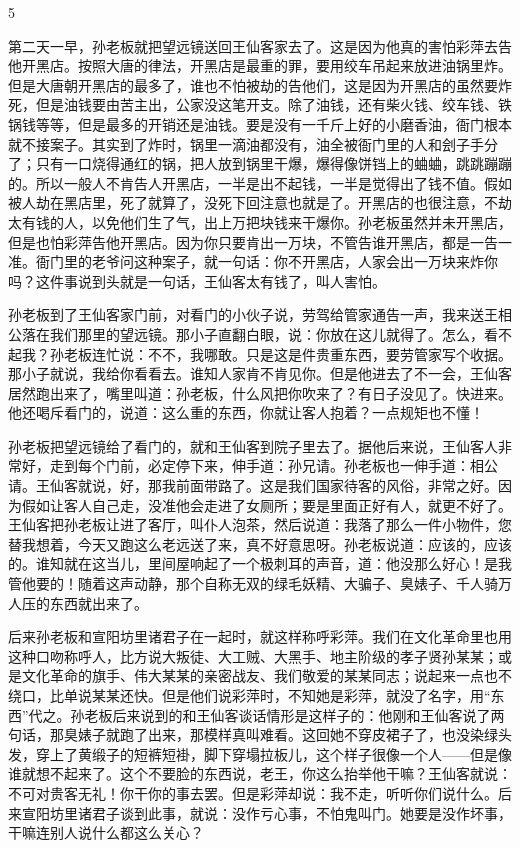5 

第二天一早，孙老板就把望远镜送回王仙客家去了。这是因为他真的害怕彩萍去告他开黑店。按照大唐的律法，开黑店是最重的罪，要用绞车吊起来放进油锅里炸。但是大唐朝开黑店的最多了，谁也不怕被劫的告他们，这是因为开黑店的虽然要炸死，但是油钱要由苦主出，公家没这笔开支。除了油钱，还有柴火钱、绞车钱、铁锅钱等等，但是最多的开销还是油钱。要是没有一千斤上好的小磨香油，衙门根本就不接案子。其实到了炸时，锅里一滴油都没有，油全被衙门里的人和刽子手分了；只有一口烧得通红的锅，把人放到锅里干爆，爆得像饼铛上的蛐蛐，跳跳蹦蹦的。所以一般人不肯告人开黑店，一半是出不起钱，一半是觉得出了钱不值。假如被人劫在黑店里，死了就算了，没死下回注意也就是了。开黑店的也很注意，不劫太有钱的人，以免他们生了气，出上万把块钱来干爆你。孙老板虽然并未开黑店，但是也怕彩萍告他开黑店。因为你只要肯出一万块，不管告谁开黑店，都是一告一准。衙门里的老爷问这种案子，就一句话：你不开黑店，人家会出一万块来炸你吗？这件事说到头就是一句话，王仙客太有钱了，叫人害怕。 

孙老板到了王仙客家门前，对看门的小伙子说，劳驾给管家通告一声，我来送王相公落在我们那里的望远镜。那小子直翻白眼，说：你放在这儿就得了。怎么，看不起我？孙老板连忙说：不不，我哪敢。只是这是件贵重东西，要劳管家写个收据。那小子就说，我给你看看去。谁知人家肯不肯见你。但是他进去了不一会，王仙客居然跑出来了，嘴里叫道：孙老板，什么风把你吹来了？有日子没见了。快进来。他还喝斥看门的，说道：这么重的东西，你就让客人抱着？一点规矩也不懂！ 

孙老板把望远镜给了看门的，就和王仙客到院子里去了。据他后来说，王仙客人非常好，走到每个门前，必定停下来，伸手道：孙兄请。孙老板也一伸手道：相公请。王仙客就说，好，那我前面带路了。这是我们国家待客的风俗，非常之好。因为假如让客人自己走，没准他会走进了女厕所；要是里面正好有人，就更不好了。王仙客把孙老板让进了客厅，叫仆人泡茶，然后说道：我落了那么一件小物件，您替我想着，今天又跑这么老远送了来，真不好意思呀。孙老板说道：应该的，应该的。谁知就在这当儿，里间屋响起了一个极刺耳的声音，道：他没那么好心！是我管他要的！随着这声动静，那个自称无双的绿毛妖精、大骗子、臭婊子、千人骑万人压的东西就出来了。 

后来孙老板和宣阳坊里诸君子在一起时，就这样称呼彩萍。我们在文化革命里也用这种口吻称呼人，比方说大叛徒、大工贼、大黑手、地主阶级的孝子贤孙某某；或是文化革命的旗手、伟大某某的亲密战友、我们敬爱的某某同志；说起来一点也不绕口，比单说某某还快。但是他们说彩萍时，不知她是彩萍，就没了名字，用“东西”代之。孙老板后来说到的和王仙客谈话情形是这样子的：他刚和王仙客说了两句话，那臭婊子就跑了出来，那模样真叫难看。这回她不穿皮裙子了，也没染绿头发，穿上了黄缎子的短裤短褂，脚下穿塌拉板儿，这个样子很像一个人——但是像谁就想不起来了。这个不要脸的东西说，老王，你这么抬举他干嘛？王仙客就说：不可对贵客无礼！你干你的事去罢。但是彩萍却说：我不走，听听你们说什么。后来宣阳坊里诸君子谈到此事，就说：没作亏心事，不怕鬼叫门。她要是没作坏事，干嘛连别人说什么都这么关心？ 

